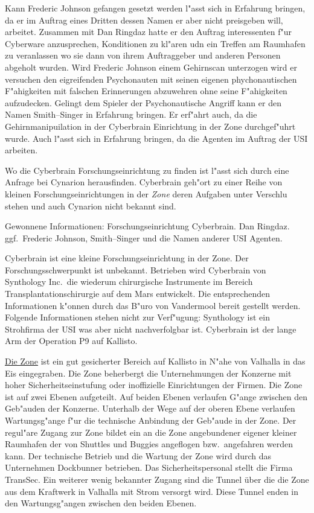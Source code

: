 Kann Frederic Johnson gefangen gesetzt werden l"asst sich in Erfahrung bringen, da\3 er im Auftrag eines Dritten dessen Namen er aber nicht preisgeben will, arbeitet. Zusammen mit Dan Ringdaz hatte er den Auftrag interessenten f"ur Cyberware anzusprechen, Konditionen zu kl"aren udn ein Treffen am Raumhafen zu veranlassen wo sie dann von ihrem Auftraggeber und anderen Personen abgeholt wurden. Wird Frederic Johnson einem Gehirnscan unterzogen wird er versuchen den eigreifenden Psychonauten mit seinen eigenen phychonautischen F"ahigkeiten mit falschen Erinnerungen abzuwehren ohne seine F"ahigkeiten aufzudecken. Gelingt dem Spieler der Psychonautische Angriff kann er den Namen Smith--Singer in Erfahrung bringen. Er erf"ahrt auch, da\3 die Gehirnmanipuilation in der Cyberbrain Einrichtung in der Zone durchgef"uhrt wurde. Auch l"asst sich in Erfahrung bringen, da\3 die Agenten im Auftrag der USI arbeiten.

Wo die Cyberbrain Forschungseinrichtung zu finden ist l"asst sich durch eine Anfrage bei Cynarion herausfinden. Cyberbrain geh"ort zu einer Reihe von kleinen Forschungseinrichtungen in der \emph{Zone} deren Aufgaben unter Verschlu\3 stehen und auch Cynarion nicht bekannt sind.

\begin{remarks}
	Gewonnene Informationen: Forschungseinrichtung Cyberbrain. Dan Ringdaz. ggf.~Frederic Johnson, Smith--Singer und die Namen anderer USI Agenten.
\end{remarks}

\newcommand{\ml}{\pinyin{Mailin2}}

Cyberbrain ist eine kleine Forschungseinrichtung in der Zone. Der Forschungsschwerpunkt ist unbekannt. Betrieben wird Cyberbrain von Synthology Inc.~die wiederum chirurgische Instrumente im Bereich Transplantationschirurgie auf dem Mars entwickelt. Die entsprechenden Informationen k"onnen durch das B"uro von Vandermool bereit gestellt werden. Folgende Informationen stehen nicht zur Verf"ugung: Synthology ist ein Strohfirma der USI was aber nicht nachverfolgbar ist. Cyberbrain ist der lange Arm der Operation P9 auf Kallisto.

\underline{Die Zone} ist ein gut gesicherter Bereich auf Kallisto in N"ahe von Valhalla in das Eis eingegraben. Die Zone beherbergt die Unternehmungen der Konzerne mit hoher Sicherheitseinstufung oder inoffizielle Einrichtungen der Firmen. Die Zone ist auf zwei Ebenen aufgeteilt. Auf beiden Ebenen verlaufen G"ange zwischen den Geb"auden der Konzerne. Unterhalb der Wege auf der oberen Ebene verlaufen Wartungsg"ange f"ur die technische Anbindung der Geb"aude in der Zone. Der regul"are Zugang zur Zone bildet ein an die Zone angebundener eigener kleiner Raumhafen der von Shuttles und Buggies angeflogen bzw.~angefahren werden kann. Der technische Betrieb und die Wartung der Zone wird durch das Unternehmen Dockbunner betrieben. Das Sicherheitspersonal stellt die Firma TransSec. Ein weiterer wenig bekannter Zugang sind die Tunnel über die die Zone aus dem Kraftwerk in Valhalla mit Strom versorgt wird. Diese Tunnel enden in den Wartungsg"angen zwischen den beiden Ebenen.

